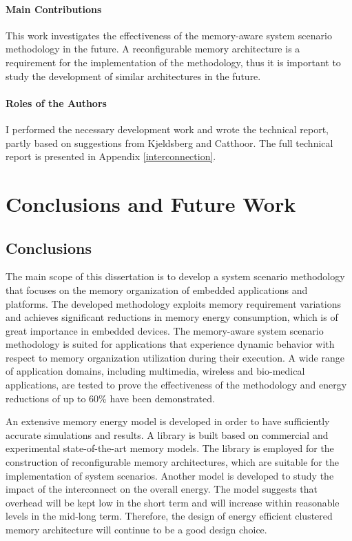 \subsubsection{Main Contributions}

This work investigates the effectiveness of the memory-aware system scenario methodology in the future.
A reconfigurable memory architecture is a requirement for the implementation of the methodology, thus it is important to study the development of similar architectures in the future. 

\subsubsection{Roles of the Authors}

I performed the necessary development work and wrote the technical report, partly based on suggestions from Kjeldsberg and Catthoor. 
The full technical report is presented in Appendix \ref{interconnection}.

\chapter{Conclusions and Future Work}
\label{conclusions}

\section{Conclusions}

The main scope of this dissertation is to develop a system scenario methodology that focuses on the memory organization of embedded applications and platforms. 
The developed methodology exploits memory requirement variations and achieves significant reductions in memory energy consumption, which is of great importance in embedded devices. 
The memory-aware system scenario methodology is suited for applications that experience dynamic behavior with respect to memory organization utilization during their execution.
A wide range of application domains, including multimedia, wireless and bio-medical applications, are tested to prove the effectiveness of the methodology and energy reductions of up to 60\% have been demonstrated.

An extensive memory energy model is developed in order to have sufficiently accurate simulations and results.
A library is built based on commercial and experimental state-of-the-art memory models.
The library is employed for the construction of reconfigurable memory architectures, which are suitable for the implementation of system scenarios.
Another model is developed to study the impact of the interconnect on the overall energy.
The model suggests that overhead will be kept low in the short term and will increase within reasonable levels in the mid-long term.
Therefore, the design of energy efficient clustered memory architecture will continue to be a good design choice.

